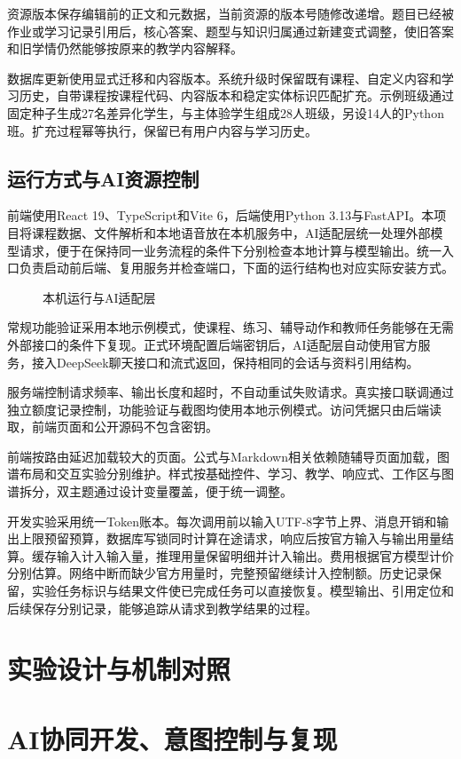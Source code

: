 \documentclass[UTF8,zihao=-4,fontset=none,a4paper]{ctexart}
\newcommand{\diagram}[2]{\par\begin{figure}[htbp]\centering\caption{#2}\end{figure}\par}
\begin{document}
资源版本保存编辑前的正文和元数据，当前资源的版本号随修改递增。题目已经被作业或学习记录引用后，核心答案、题型与知识归属通过新建变式调整，使旧答案和旧学情仍然能够按原来的教学内容解释。

数据库更新使用显式迁移和内容版本。系统升级时保留既有课程、自定义内容和学习历史，自带课程按课程代码、内容版本和稳定实体标识匹配扩充。示例班级通过固定种子生成27名差异化学生，与主体验学生组成28人班级，另设14人的Python班。扩充过程幂等执行，保留已有用户内容与学习历史。


\subsection{运行方式与AI资源控制}

前端使用React 19、TypeScript和Vite 6，后端使用Python 3.13与FastAPI。本项目将课程数据、文件解析和本地语音放在本机服务中，AI适配层统一处理外部模型请求，便于在保持同一业务流程的条件下分别检查本地计算与模型输出。统一入口负责启动前后端、复用服务并检查端口，下面的运行结构也对应实际安装方式。
\diagram{deployment}{本机运行与AI适配层}
常规功能验证采用本地示例模式，使课程、练习、辅导动作和教师任务能够在无需外部接口的条件下复现。正式环境配置后端密钥后，AI适配层自动使用官方服务，接入DeepSeek聊天接口和流式返回\cite{deepseek}，保持相同的会话与资料引用结构。

服务端控制请求频率、输出长度和超时，不自动重试失败请求。真实接口联调通过独立额度记录控制，功能验证与截图均使用本地示例模式。访问凭据只由后端读取，前端页面和公开源码不包含密钥。

前端按路由延迟加载较大的页面\cite{react}。公式与Markdown相关依赖随辅导页面加载，图谱布局和交互实验分别维护。样式按基础控件、学习、教学、响应式、工作区与图谱拆分，双主题通过设计变量覆盖，便于统一调整。


开发实验采用统一Token账本。每次调用前以输入UTF-8字节上界、消息开销和输出上限预留预算，数据库写锁同时计算在途请求，响应后按官方输入与输出用量结算\cite{tokens}。缓存输入计入输入量，推理用量保留明细并计入输出。费用根据官方模型计价分别估算\cite{pricing}。网络中断而缺少官方用量时，完整预留继续计入控制额。历史记录保留，实验任务标识与结果文件使已完成任务可以直接恢复。模型输出、引用定位和后续保存分别记录，能够追踪从请求到教学结果的过程。

\section{实验设计与机制对照}


\section{AI协同开发、意图控制与复现}
\end{document}

